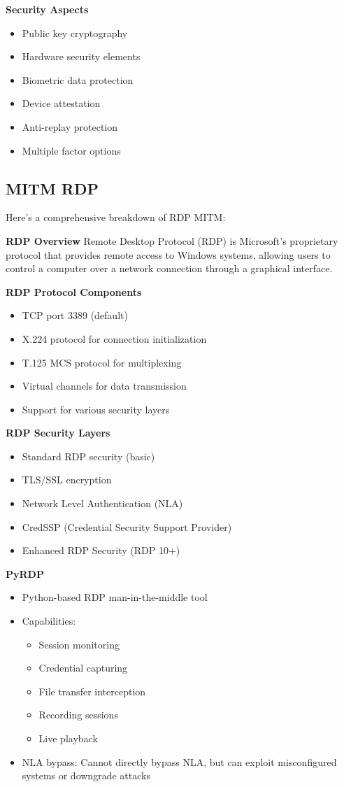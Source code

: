 \textbf{Security Aspects}
\begin{itemize}
    \item Public key cryptography
    \item Hardware security elements
    \item Biometric data protection
    \item Device attestation
    \item Anti-replay protection
    \item Multiple factor options
\end{itemize}

\subsection{MITM RDP}
Here's a comprehensive breakdown of RDP MITM:

\textbf{RDP Overview}
Remote Desktop Protocol (RDP) is Microsoft's proprietary protocol that provides remote access to Windows systems, allowing users to control a computer over a network connection through a graphical interface.

\textbf{RDP Protocol Components}
\begin{itemize}
    \item TCP port 3389 (default)
    \item X.224 protocol for connection initialization
    \item T.125 MCS protocol for multiplexing
    \item Virtual channels for data transmission
    \item Support for various security layers
\end{itemize}

\textbf{RDP Security Layers}
\begin{itemize}
    \item Standard RDP security (basic)
    \item TLS/SSL encryption
    \item Network Level Authentication (NLA)
    \item CredSSP (Credential Security Support Provider)
    \item Enhanced RDP Security (RDP 10+)
\end{itemize}

\textbf{PyRDP}
\begin{itemize}
    \item Python-based RDP man-in-the-middle tool
    \item Capabilities:
        \begin{itemize}
            \item Session monitoring
            \item Credential capturing
            \item File transfer interception
            \item Recording sessions
            \item Live playback
        \end{itemize}
    \item NLA bypass: Cannot directly bypass NLA, but can exploit misconfigured systems or downgrade attacks
\end{itemize}

